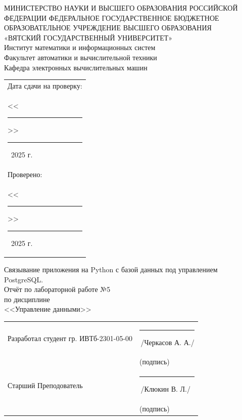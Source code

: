 \documentclass[oneside,a4paper,14pt]{extarticle}
\begin{document}
\newpage
\thispagestyle{empty}
\begin{center}
  МИНИСТЕРСТВО НАУКИ И ВЫСШЕГО ОБРАЗОВАНИЯ РОССИЙСКОЙ ФЕДЕРАЦИИ ФЕДЕРАЛЬНОЕ ГОСУДАРСТВЕННОЕ БЮДЖЕТНОЕ ОБРАЗОВАТЕЛЬНОЕ УЧРЕЖДЕНИЕ ВЫСШЕГО ОБРАЗОВАНИЯ\\
  «ВЯТСКИЙ ГОСУДАРСТВЕННЫЙ УНИВЕРСИТЕТ»\\
  Институт математики и информационных систем\\
  Факультет автоматики и вычислительной техники\\
  Кафедра электронных вычислительных машин
\end{center}
\vspace{10mm}

\hfill
\begin{tabular}{l}
  \footnotesize Дата сдачи на проверку:                                          \\
  \footnotesize <<\rule[-1mm]{5mm}{0.10mm}\/>>\rule[-1mm]{20mm}{0.10mm}\ 2025 г. \\
  \footnotesize Проверено:                                                       \\
  \footnotesize <<\rule[-1mm]{5mm}{0.10mm}\/>>\rule[-1mm]{20mm}{0.10mm}\ 2025 г. \\
\end{tabular}
\vfill

\begin{center}
  Связывание приложения на Python с базой данных под управлением PostgreSQL.\\
  Отчёт по лабораторной работе №5\\
  по дисциплине\\
  <<Управление данными>>\\
\end{center}
\vspace{25mm}
\noindent
\begin{tabular}{ll}
  Разработал студент гр. ИВТб-2301-05-00 & \hspace{18mm}\rule[-1mm]{30mm}{0.10mm}\,/Черкасов А. А./ \\
                                         & \hspace{25.5mm}\footnotesize(подпись)                    \\
  Старший Преподователь                  & \hspace{18mm}\rule[-1mm]{30mm}{0.10mm}\,/Клюкин В. Л./   \\
                                         & \hspace{25.5mm}\footnotesize(подпись)                    \\
\end{tabular}
\end{document}
